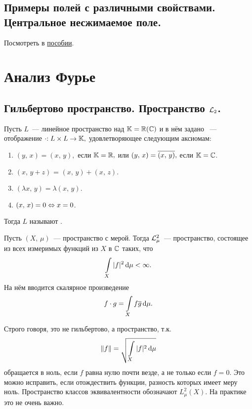 \documentclass{notes}
\begin{document}
\section{Примеры полей с различными свойствами. Центральное несжимаемое поле.}

	Посмотреть в \href{http://www.math.spbu.ru/analysis/tutorial/vecfi.pdf}{пособии}.

\chapter{Анализ Фурье}

\section{Гильбертово пространство. Пространство $\mathcal{L}_2$.}

	\begin{de}
		Пусть $L$~--- линейное пространство над $\mathbb{K} = \mathbb{R}(\mathbb{C})$ и в нём задано ~--- отображение $\cdot\text{\text{:}} \; L \times L \to \mathbb{K},$ удовлетворяющее следующим аксиомам:
		\begin{enumerate}
			\item $(y, \, x) = (x, \, y),$ если $\mathbb{K} = \mathbb{R},$ или $(y, \, x) = \overline{(x, \, y)},$ если $\mathbb{K} = \mathbb{C}$.
			\item $(x, \, y + z)$ = $(x, \, y) + (x, \, z)$.
			\item $(\lambda x, \, y) = \lambda(x, \, y)$.
			\item $(x, \, x) = 0 \Leftrightarrow x = 0$.
		\end{enumerate}
		Тогда $L$ называют .
	\end{de}

	\begin{de}
		Пусть $(X, \, \mu)$~--- пространство с мерой. Тогда $\mathcal{L}^2_{\mu}$~--- пространство, состоящее из всех измеримых функций из $X$ в $\mathbb{C}$ таких, что
		\[
			\int\limits_{X} |f|^2 \, \mathrm{d} \mu < \infty.
		\]
		На нём вводится скалярное произведение
		\[
			f \cdot g = \int\limits_{X} f \overline{g} \, \mathrm{d} \mu.
		\]
	\end{de}

	\begin{rem}
		Строго говоря, это не гильбертово, а  пространство, т.к.
		\[
			\|f\| = \sqrt{\int\limits_{X} |f|^2 \, \mathrm{d} \mu}
		\]
		обращается в ноль, если $f$ равна нулю почти везде, а не только если $f = 0$. Это можно исправить, если отождествить функции, разность которых имеет меру ноль. Пространство классов эквивалентности обозначают $L^2_{\mu}(X)$. На практике это не очень важно.
	\end{rem}
\end{document}
